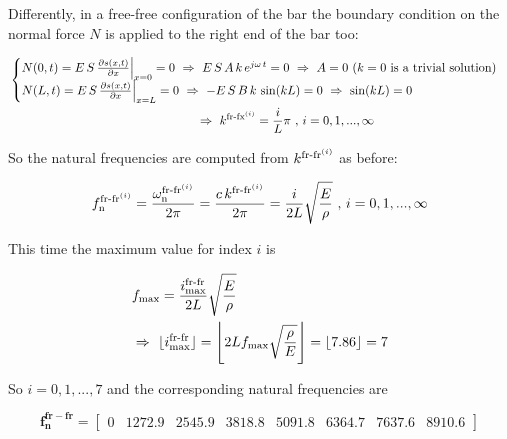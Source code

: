 \documentclass[a4paper,12pt,oneside]{article}
\begin{document}
Differently, in a free-free configuration of the bar the boundary condition on the normal force $ N $ is applied to the right end of the bar too:

\[ \begin{split}
	& \begin{cases}
			N(0,t) = E \, S \, \frac{\partial s(x,t)}{\partial x} \Big|_{x=0} = 0 %
				~ \Rightarrow ~ E \, S \, A \, k \, e^{j \omega \, t} = 0 %
				~ \Rightarrow ~ A = 0 ~ \text{($ k = 0 $ is a trivial solution)} \\
			N(L,t) = E \, S \, \frac{\partial s(x,t)}{\partial x} \Big|_{x=L} = 0 %
				~ \Rightarrow ~ - E \, S \, B \, k \, \sin(kL) = 0 ~ \Rightarrow ~ \sin(kL) = 0
	\end{cases}	\\
	& \hspace{150pt}~ \Rightarrow ~ %
		k^{\textup{fr-fx}^{(i)}} = \frac{i}{L} \pi ~ \text{,} ~ i = 0,1,...,\infty
\end{split} \]

So the natural frequencies are computed from $ k^{\textup{fr-fr}^{(i)}} $ as before:

\[
	f_\textup{n}^{\textup{fr-fr}^{(i)}} = %
		\frac{\omega_\textup{n}^{\textup{fr-fr}^{(i)}}}{2 \pi} = %
		\frac{c \, k^{\textup{fr-fr}^{(i)}}}{2 \pi} = %
		\frac{i}{2L} \sqrt{\frac{E}{\rho}} ~ \text{,} ~ i = 0,1,...,\infty
\]

This time the maximum value for index $ i $ is

\[ \begin{split}
	& f_\textup{max} = \frac{i^\textup{fr-fr}_\textup{max}}{2L} %
		\sqrt{\frac{E}{\rho}} \\
	& \Rightarrow ~ \lfloor i^\textup{fr-fr}_\textup{max} \rfloor = %
		\Biggl\lfloor 2 L f_\textup{max} \sqrt{\frac{\rho}{E}} \Biggr\rfloor = %
		\lfloor 7.86 \rfloor = 7
\end{split} \]

So $ i = 0,1,...,7 $ and the corresponding natural frequencies are

\[
	\mathbf{f_n^{fr-fr}} =	\begin{bmatrix}
																	0					& 1272.9	& 2545.9	& 3818.8 %
																	& 5091.8	& 6364.7	& 7637.6	& 8910.6
													\end{bmatrix}
\]
\end{document}
